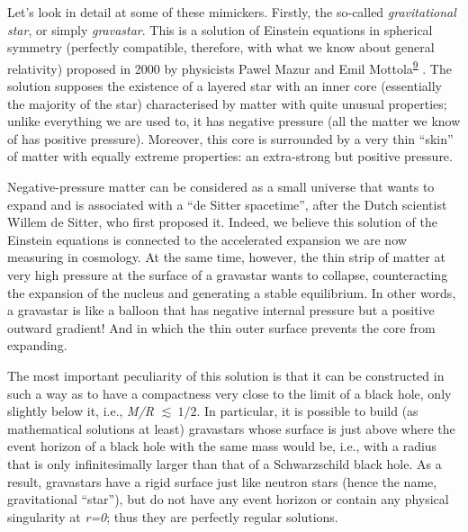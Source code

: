 Let's look in detail at some of these mimickers. Firstly, the so-called
\emph{gravitational star}, or simply
\emph{gravastar}. This is a solution of Einstein
equations in spherical symmetry (perfectly compatible, therefore, with
what we know about general relativity) proposed in 2000 by physicists Pawel
Mazur and Emil Mottola\textsuperscript{\hyperlink{note:06-09}{9}} . The
solution supposes the existence of a layered star with an inner core (essentially the
majority of the star) characterised by matter with quite unusual properties; unlike
everything we are used to, it has negative pressure (all the matter we
know of has positive pressure). Moreover, this core is surrounded by a
very thin ``skin'' of matter with equally extreme properties: an extra-strong but
positive pressure.

Negative-pressure matter can be considered as a small universe that wants to expand and
is associated with a ``de Sitter spacetime'', after the Dutch
scientist Willem de Sitter, who first proposed it. Indeed, we believe
this solution of the Einstein equations is connected to the accelerated expansion we are
now measuring in cosmology. At the same time, however, the thin strip of matter at very
high pressure at the surface of a gravastar wants to collapse, counteracting the
expansion of the nucleus and generating a stable equilibrium. In other words, a
gravastar is like a balloon that has negative internal pressure but a
positive outward gradient! And in which the thin outer surface prevents the core from
expanding.

The most important peculiarity of this solution is that it can be constructed in such a
way as to have a compactness very close to the limit of a black hole,
only slightly below it, i.e., \emph{M/R} \(\lesssim \ 1/2\). In particular, it is
possible to build (as mathematical solutions at least) gravastars whose surface is just
above where the event horizon of a black hole with the same mass would
be, i.e., with a radius that is only infinitesimally larger than that of a Schwarzschild
black hole. As a result, gravastars have a rigid
surface just like neutron stars (hence the name, gravitational ``star''), but do not
have any event horizon or contain any physical singularity at
\emph{r=0}; thus they are perfectly regular solutions.

